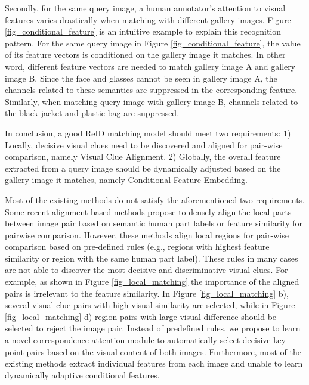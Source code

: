 \documentclass[final]{cvpr}
\begin{document}
Secondly, for the same query image, a human annotator's attention to visual features varies drastically when matching with different gallery images. Figure \ref{fig_conditional_feature} is an intuitive example to explain this recognition pattern. For the same query image in Figure \ref{fig_conditional_feature}, the value of its feature vectors is conditioned on the gallery image it matches. In other word, different feature vectors are needed to match gallery image A and gallery image B. Since the face and glasses cannot be seen in gallery image A, the channels related to these semantics are suppressed in the corresponding feature. Similarly, when matching query image with gallery image B, channels related to the black jacket and plastic bag are suppressed. 

In conclusion, a good ReID matching model should meet two requirements: 1) Locally, decisive visual clues need to be discovered and aligned for pair-wise comparison, namely Visual Clue Alignment. 
2) Globally, the overall feature extracted from a query image should be dynamically adjusted based on the gallery image it matches, namely Conditional Feature Embedding. 







Most of the existing methods do not satisfy the aforementioned two requirements. 
Some recent alignment-based methods propose to densely align the local parts between image pair based on semantic human part labels \cite{wang2020high,sun2019perceive} or feature similarity \cite{Sun_2018_ECCV,zhang2017alignedreid,he2018deep} for pairwise comparison. 
However, these methods align local regions for pair-wise comparison based on pre-defined rules (e.g., regions with highest feature similarity or region with the same human part label). 
These rules in many cases are not able to discover the most decisive and discriminative visual clues. 
For example, as shown in Figure \ref{fig_local_matching} the importance of the aligned pairs is irrelevant to the feature similarity. In Figure \ref{fig_local_matching} b), several visual clue pairs with high visual similarity are selected, while in Figure \ref{fig_local_matching} d) region pairs with large visual difference should be selected to reject the image pair. 
Instead of predefined rules, we propose to learn a novel correspondence attention module to automatically select decisive key-point pairs based on the visual content of both images.
Furthermore, most of the existing methods extract individual features from each image and unable to learn dynamically adaptive conditional features. 
\end{document}
